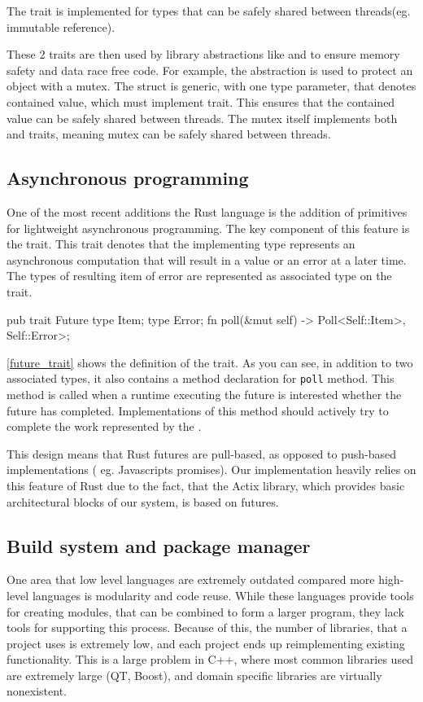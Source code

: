 The  trait is implemented for types that can be safely shared between threads(eg. immutable reference).

These 2 traits are then used by library abstractions like  and  to ensure memory safety and data race free code.
For example, the  abstraction is used to protect an object with a mutex. The  struct is generic,
with one type parameter, that denotes contained value, which must implement  trait.
This ensures that the contained value can be safely shared between threads. The mutex itself implements both  and  traits,
meaning mutex can be safely shared between threads.

\subsection{Asynchronous programming}
One of the most recent additions the Rust language is the addition of primitives for lightweight asynchronous programming.
The key component of this feature is the  trait. This trait denotes that the implementing type represents
an asynchronous computation that will result in a value or an error at a later time. The types of resulting item of error
are represented as associated type on the  trait.

\begin{code}[language=rust,label={future_trait},caption={Future trait}]
pub trait Future {
    type Item;
    type Error;
    fn poll(&mut self) -> Poll<Self::Item>, Self::Error>;
}
\end{code}

\autoref{future_trait} shows the definition of the  trait. As you can see, in addition to two associated types,
it also contains a method declaration for \verb|poll| method. This method is called when a runtime executing the future
is interested whether the future has completed. Implementations of this method should actively try to complete
the work represented by the .

This design means that Rust futures are pull-based, as opposed to push-based implementations ( eg. Javascripts promises).
Our implementation heavily relies on this feature of Rust due to the fact, that the Actix library, which provides
basic architectural blocks of our system, is based on futures.

\subsection{Build system and package manager}
One area that low level languages are extremely outdated compared more high-level languages is modularity and code reuse.
While these languages provide tools for creating modules, that can be combined to form a larger program, they lack tools
for supporting this process. Because of this, the number of libraries, that a project uses is extremely low, and
each project ends up reimplementing existing functionality. This is a large problem in C++, where most common
libraries used are extremely large (QT, Boost), and domain specific libraries are virtually nonexistent.

